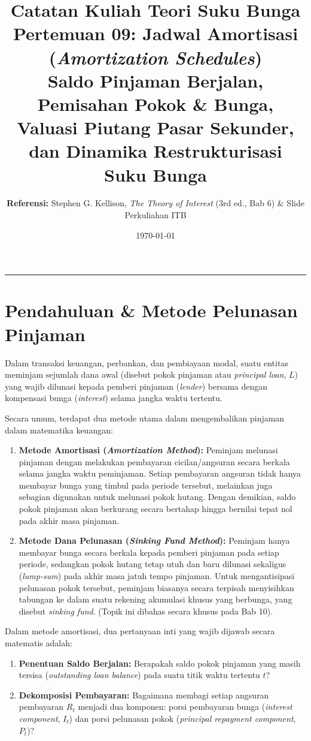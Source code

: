 \documentclass[11pt,a4paper]{article}
\title{\textbf{\LARGE Catatan Kuliah Teori Suku Bunga}\\[0.3em]
\Large Pertemuan 09: Jadwal Amortisasi (\textit{Amortization Schedules})\\[0.2em]
\large Saldo Pinjaman Berjalan, Pemisahan Pokok \& Bunga, Valuasi Piutang Pasar Sekunder, dan Dinamika Restrukturisasi Suku Bunga}
\author{\textbf{Referensi:} Stephen G. Kellison, \textit{The Theory of Interest} (3rd ed., Bab 6) \& Slide Perkuliahan ITB}
\date{\today}
\begin{document}
\maketitle
\tableofcontents
\vspace{1em}
\noindent\rule{\textwidth}{0.4pt}
\vspace{1.5em}

\section{Pendahuluan \& Metode Pelunasan Pinjaman}

Dalam transaksi keuangan, perbankan, dan pembiayaan modal, suatu entitas meminjam sejumlah dana awal (disebut pokok pinjaman atau \textit{principal loan}, $L$) yang wajib dilunasi kepada pemberi pinjaman (\textit{lender}) bersama dengan kompensasi bunga (\textit{interest}) selama jangka waktu tertentu.

Secara umum, terdapat dua metode utama dalam mengembalikan pinjaman dalam matematika keuangan:
\begin{enumerate}[label=\textbf{\arabic*.}]
    \item \textbf{Metode Amortisasi (\textit{Amortization Method}):}
    Peminjam melunasi pinjaman dengan melakukan pembayaran cicilan/angsuran secara berkala selama jangka waktu peminjaman. Setiap pembayaran angsuran tidak hanya membayar bunga yang timbul pada periode tersebut, melainkan juga sebagian digunakan untuk melunasi pokok hutang. Dengan demikian, saldo pokok pinjaman akan berkurang secara bertahap hingga bernilai tepat nol pada akhir masa pinjaman.
    \item \textbf{Metode Dana Pelunasan (\textit{Sinking Fund Method}):}
    Peminjam hanya membayar bunga secara berkala kepada pemberi pinjaman pada setiap periode, sedangkan pokok hutang tetap utuh dan baru dilunasi sekaligus (\textit{lump-sum}) pada akhir masa jatuh tempo pinjaman. Untuk mengantisipasi pelunasan pokok tersebut, peminjam biasanya secara terpisah menyisihkan tabungan ke dalam suatu rekening akumulasi khusus yang berbunga, yang disebut \textit{sinking fund}. (Topik ini dibahas secara khusus pada Bab 10).
\end{enumerate}

\begin{notebox}
Dalam metode amortisasi, dua pertanyaan inti yang wajib dijawab secara matematis adalah:
\begin{enumerate}[label=(\alph*)]
    \item \textbf{Penentuan Saldo Berjalan:} Berapakah saldo pokok pinjaman yang masih tersisa (\textit{outstanding loan balance}) pada suatu titik waktu tertentu $t$?
    \item \textbf{Dekomposisi Pembayaran:} Bagaimana membagi setiap angsuran pembayaran $R_t$ menjadi dua komponen: porsi pembayaran bunga (\textit{interest component}, $I_t$) dan porsi pelunasan pokok (\textit{principal repayment component}, $P_t$)?
\end{enumerate}
\end{notebox}
\end{document}
